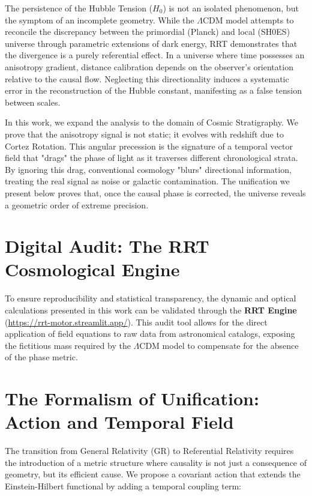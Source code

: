 \documentclass[12pt, a4paper]{article}
\begin{document}
The persistence of the Hubble Tension ($H_0$) is not an isolated phenomenon, but the symptom of an incomplete geometry. While the $\Lambda$CDM model attempts to reconcile the discrepancy between the primordial (Planck) and local (SH0ES) universe through parametric extensions of dark energy, RRT demonstrates that the divergence is a purely referential effect. In a universe where time possesses an anisotropy gradient, distance calibration depends on the observer's orientation relative to the causal flow. Neglecting this directionality induces a systematic error in the reconstruction of the Hubble constant, manifesting as a false tension between scales.

In this work, we expand the analysis to the domain of Cosmic Stratigraphy. We prove that the anisotropy signal is not static; it evolves with redshift due to Cortez Rotation. This angular precession is the signature of a temporal vector field that "drags" the phase of light as it traverses different chronological strata. By ignoring this drag, conventional cosmology "blurs" directional information, treating the real signal as noise or galactic contamination. The unification we present below proves that, once the causal phase is corrected, the universe reveals a geometric order of extreme precision.

\section*{Digital Audit: The RRT Cosmological Engine}
To ensure reproducibility and statistical transparency, the dynamic and optical calculations presented in this work can be validated through the \textbf{RRT Engine} (\url{https://rrt-motor.streamlit.app/}). This audit tool allows for the direct application of field equations to raw data from astronomical catalogs, exposing the fictitious mass required by the $\Lambda$CDM model to compensate for the absence of the phase metric.

\section{The Formalism of Unification: Action and Temporal Field}

The transition from General Relativity (GR) to Referential Relativity requires the introduction of a metric structure where causality is not just a consequence of geometry, but its efficient cause. We propose a covariant action that extends the Einstein-Hilbert functional by adding a temporal coupling term:
\end{document}
